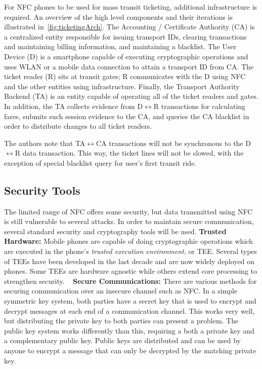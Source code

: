 \documentclass{sig-alternate}
\begin{document}
For NFC phones to be used for mass transit ticketing, additional infrastructure is required. An overview of the high level components and their iterations is illustrated in~\ref{fig:ticketingArch}. The Accounting / Certificate Authority (CA) is a centralized entity responsible for issuing transport IDs, clearing transactions and maintaining billing information, and maintaining a blacklist. The User Device (D) is a smartphone capable of executing cryptographic operations and uses WLAN or a mobile data connection to attain a transport ID from CA. The ticket reader (R) sits at transit gates; R communicates with the D using NFC and the other entities using infrastructure. Finally, the Transport Authority Backend (TA) is an entity capable of operating all of the ticket readers and gates. In addition, the TA collects evidence from D$\leftrightarrow$R transactions for calculating fares, submits such session evidence to the CA, and queries the CA blacklist in order to distribute changes to all ticket readers.

The authors note that TA$\leftrightarrow$CA transactions will not be synchronous to the D$\leftrightarrow$R data transaction. This way, the ticket lines will not be slowed, with the exception of special blacklist query for user's first transit ride.

\subsection{Security Tools}
The limited range of NFC offers some security, but data transmitted using NFC is still vulnerable to several attacks. In order to maintain secure communication, several standard security and cryptography tools will be used.
\vspace{2mm}\newline
\noindent\textbf{Trusted Hardware:}
Mobile phones are capable of doing cryptographic operations which are executed in the phone's \textit{trusted execution environment}, or TEE. Several types of TEEs have been developed in the last decade and are now widely deployed on phones. Some TEEs are hardware agnostic while others extend core processing to strengthen security.
~\cite{Ticket2011}  
\vspace{2mm}\newline
\textbf{Secure Communications:}
There are various methods for securing communication over an insecure channel such as NFC. In a simple symmetric key system, both parties have a secret key that is used to encrypt and decrypt messages at each end of a communication channel. This works very well, but distributing the private key to both parties can present a problem. The public key system works differently than this, requiring a both a private key and a complementary public key. Public keys are distributed and can be used by anyone to encrypt a message that can only be decrypted by the matching private key.~\cite{crypto}
\end{document}
